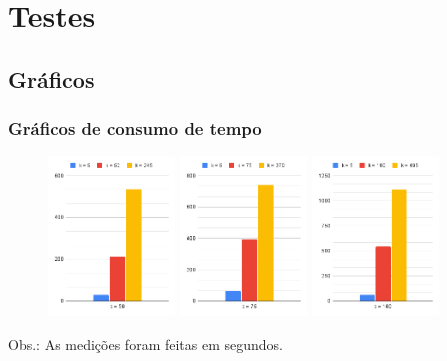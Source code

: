 \documentclass{beamer}
\begin{document}
\section{Testes}

\subsection{Gráficos}
\begin{frame}
  \frametitle{Gráficos de consumo de tempo}
  \begin{figure}
    \centering
    \includegraphics[width=0.3\textwidth]{t_d_peq.png}
    \includegraphics[width=0.3\textwidth]{t_d_med.png}
    \includegraphics[width=0.3\textwidth]{t_d_gra.png}
  \end{figure}
  Obs.: As medições foram feitas em segundos.
\end{frame}

\end{document}
